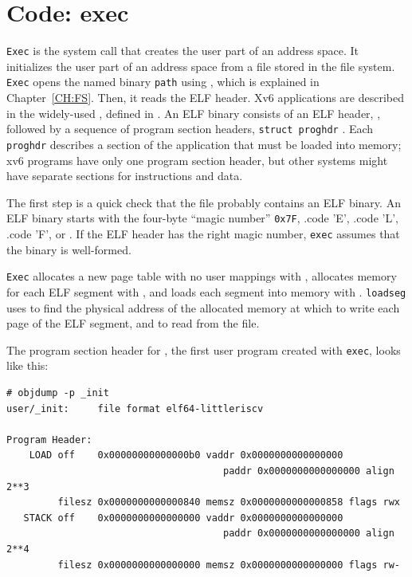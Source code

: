 \section{Code: exec}
\lstinline{Exec}
is the system call that creates the user part of an address space.  It
initializes the user part of an address space from a file stored in the file
system.
\lstinline{Exec}
opens the named binary
\lstinline{path}
using
,
which is explained in Chapter~\ref{CH:FS}.
Then, it reads the ELF header. Xv6 applications are described in the widely-used
,
defined in
.
An ELF binary consists of an ELF header,
,
followed by a sequence of program section headers,
\lstinline{struct proghdr}
.
Each
\lstinline{proghdr}
describes a section of the application that must be loaded into memory;
xv6 programs have only one program section header, but
other systems might have separate sections
for instructions and data.

The first step is a quick check that the file probably contains an
ELF binary.
An ELF binary starts with the four-byte ``magic number''
\lstinline{0x7F},
.code 'E',
.code 'L',
.code 'F',
or
.
If the ELF header has the right magic number,
\lstinline{exec}
assumes that the binary is well-formed.

\lstinline{Exec}
allocates a new page table with no user mappings with
,
allocates memory for each ELF segment with
,
and loads each segment into memory with
.
\lstinline{loadseg}
uses
to find the physical address of the allocated memory at which to write
each page of the ELF segment, and
to read from the file.

The program section header for
,
the first user program created with
\lstinline{exec},
looks like this:
\begin{footnotesize}
\begin{verbatim}
# objdump -p _init
user/_init:     file format elf64-littleriscv

Program Header:
    LOAD off    0x00000000000000b0 vaddr 0x0000000000000000 
                                      paddr 0x0000000000000000 align 2**3
         filesz 0x0000000000000840 memsz 0x0000000000000858 flags rwx
   STACK off    0x0000000000000000 vaddr 0x0000000000000000 
                                      paddr 0x0000000000000000 align 2**4
         filesz 0x0000000000000000 memsz 0x0000000000000000 flags rw-
\end{verbatim}
\end{footnotesize}

